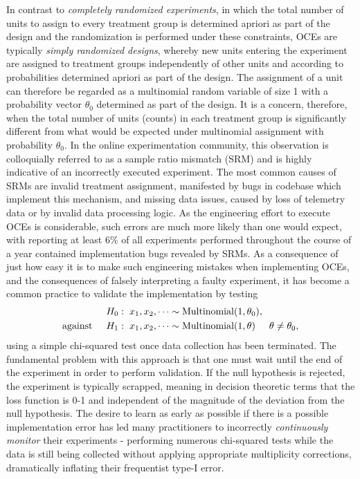 \documentclass[11pt]{article}
\begin{document}
In contrast to \textit{completely randomized experiments}, in which the total number of units to assign to every treatment group is determined apriori as part of the design and the randomization is performed under these constraints, OCEs are typically \textit{simply randomized designs}, whereby new units entering the experiment are assigned to treatment groups independently of other units and according to probabilities determined apriori as part of the design. The assignment of a unit can therefore be regarded as a multinomial random variable of size 1 with a probability vector $\theta_0$ determined as part of the design. It is a concern, therefore, when the total number of units (counts) in each treatment group is significantly different from what would be expected under multinomial assignment with probability $\theta_0$. In the online experimentation community, this observation is colloquially referred to as a sample ratio mismatch (SRM) and is highly indicative of an incorrectly executed experiment. The most common causes of SRMs are invalid treatment assignment, manifested by bugs in codebase which implement this mechanism, and missing data issues, caused by loss of telemetry data or by invalid data processing logic. As the engineering effort to execute OCEs is considerable, such errors are much more likely than one would expect, with \cite{fabijan} reporting at least 6\% of all experiments performed throughout the course of a year contained implementation bugs revealed by SRMs. As a consequence of just how easy it is to make such engineering mistakes when implementing OCEs, and the consequences of falsely interpreting a faulty experiment, it has become a common practice to validate the implementation by testing
\begin{align}
  \label{eq:srm-hypothesis-test}
  H_0:&\hspace{0.2cm} x_1, x_2, \dots \sim \text{Multinomial}(1,\theta_0),\\
  \text{against}\hspace{0.5cm} H_1:&\hspace{0.2cm} x_1, x_2, \dots \sim \text{Multinomial}(1, \theta) \hspace{0.5cm} \theta \neq \theta_0,
\end{align}
using a simple chi-squared test once data collection has been terminated. The fundamental problem with this approach is that one must wait until the end of the experiment in order to perform validation. If the null hypothesis is rejected, the experiment is typically scrapped, meaning in decision theoretic terms that the loss function is 0-1 and independent of the magnitude of the deviation from the null hypothesis. The desire to learn as early as possible if there is a possible implementation error has led many practitioners to incorrectly \textit{continuously monitor} their experiments - performing numerous chi-squared tests while the data is still being collected without applying appropriate multiplicity corrections, dramatically inflating their frequentist type-I error.
\end{document}
